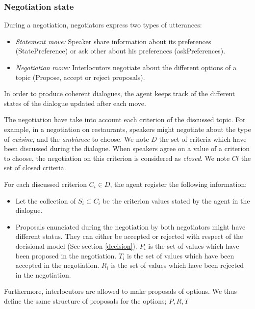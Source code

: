 \documentclass{llncs}
\begin{document}
				
				\subsubsection{Negotiation state}
				During a negotiation, negotiators express two types of utterances: %
				
				\begin{itemize} [noitemsep]
					\item \emph{Statement move:} Speaker share information about its preferences (StatePreference) or ask other about his preferences (askPreferences).
					\item \emph{Negotiation move:} Interlocutors negotiate about the different options of a topic (Propose, accept or reject proposals).
				\end{itemize}
				
				
				In order to produce coherent dialogues, the agent keeps track of the different states of the dialogue updated after each move. 
				
				The negotiation have take into account each criterion of the discussed topic. For example, in a negotiation on restaurants, speakers might negotiate about the type of \textit{cuisine}, and the \textit{ambiance} to choose.  We note $D$ the set of criteria which have been discussed during the dialogue. When speakers agree on a value of a criterion to choose, the negotiation on this criterion is considered as \textit{closed}. We note $Cl$ the set of closed criteria.
				
				For each discussed criterion $C_i \in D$, the agent register the following information:		
				\begin{itemize} [noitemsep]
					\item Let the collection of $S_i \subset C_i$ be the criterion values stated by the agent in the dialogue.
					\item Proposals enunciated during the negotiation by both negotiators might have different status. They can either be accepted or rejected with respect of the decisional model (See section \ref{decision}).
					\subitem  $P_i$ is the set of  values which have been proposed in the negotiation.
					\subitem  $T_i$  is the set of values which have been accepted in the negotiation.
					\subitem  $R_i$  is the set of values which have been rejected in the negotiation.
				\end{itemize}
				
				Furthermore, interlocutors are allowed to make proposals of options. We thus define the same structure of proposals for the options; $P, R, T$
				
\end{document}
